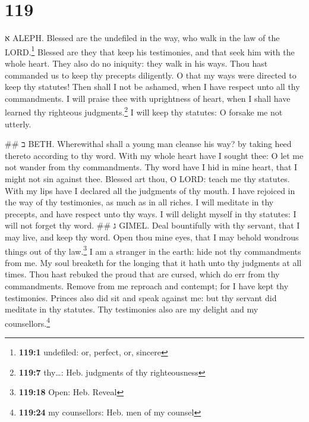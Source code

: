 \hypertarget{section-118}{%
\subsection{}\label{section-118}}

\hypertarget{section-119}{%
\section{119}\label{section-119}}

א ALEPH.  Blessed are the undefiled in the way, who walk
in the law of the LORD.\footnote{\textbf{119:1} undefiled: or, perfect,
  or, sincere}  Blessed are they that keep his
testimonies, and that seek him with the whole heart.  They
also do no iniquity: they walk in his ways.  Thou hast
commanded us to keep thy precepts diligently.  O that my
ways were directed to keep thy statutes!  Then shall I not
be ashamed, when I have respect unto all thy commandments.
 I will praise thee with uprightness of heart, when I
shall have learned thy righteous judgments.\footnote{\textbf{119:7}
  thy\ldots: Heb. judgments of thy righteousness}  I will
keep thy statutes: O forsake me not utterly.

\#\# ב BETH.  Wherewithal shall a young man cleanse his
way? by taking heed thereto according to thy word.  With
my whole heart have I sought thee: O let me not wander from thy
commandments.  Thy word have I hid in mine heart, that I
might not sin against thee.  Blessed art thou, O LORD:
teach me thy statutes.  With my lips have I declared all
the judgments of thy mouth.  I have rejoiced in the way
of thy testimonies, as much as in all riches.  I will
meditate in thy precepts, and have respect unto thy ways.
 I will delight myself in thy statutes: I will not forget
thy word. \#\# ג GIMEL.  Deal bountifully with thy
servant, that I may live, and keep thy word.  Open thou
mine eyes, that I may behold wondrous things out of thy law.\footnote{\textbf{119:18}
  Open: Heb. Reveal}  I am a stranger in the earth: hide
not thy commandments from me.  My soul breaketh for the
longing that it hath unto thy judgments at all times. 
Thou hast rebuked the proud that are cursed, which do err from thy
commandments.  Remove from me reproach and contempt; for
I have kept thy testimonies.  Princes also did sit and
speak against me: but thy servant did meditate in thy statutes.
 Thy testimonies also are my delight and my
counsellors.\footnote{\textbf{119:24} my counsellors: Heb. men of my
  counsel}

